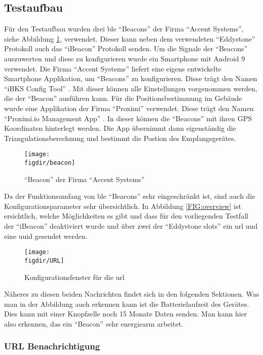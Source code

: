 \subsection{Testaufbau}
\label{ss:ibeacon:kommunikation}

Für den Testaufbau wurden drei \ac{ble} "`Beacons"' der Firma "`Accent Systems"', siehe Abbildung \ref{FIG:beacon}, verwendet. Dieser kann neben dem verwendeten "`Eddystone"' Protokoll auch das "`iBeacon"' Protokoll senden. Um die Signale der "`Beacons"' auszuwerten und diese zu konfigurieren wurde ein Smartphone mit Android 9 verwendet. Die Firma "`Accent Systems"' liefert eine eigens entwickelte Smartphone Applikation, um "`Beacons"' zu konfigurieren. Diese trägt den Namen "`iBKS Config Tool"' \cite{BKS:WWW}. Mit dieser können alle Einstellungen vorgenommen werden, die der "`Beacon"' ausführen kann. Für die Positionsbestimmung im Gebäude wurde eine Applikation der Firma "`Proximi"' verwendet. Diese trägt den Namen "`Proximi.io Management App"' \cite{PRX:WWW}. In dieser können die "`Beacons"' mit ihren GPS Koordinaten hinterlegt werden. Die App übernimmt dann eigenständig die Triangulationsberechnung und bestimmt die Postion des Empfangsgerätes.\\ 

\begin{figure}[h]
	\centering
	\texttt{[image: \\figdir/beacon]}
	\caption{"`Beacon"' der Firma "`Accent Systems"'}
	\label{FIG:beacon}
\end{figure}

\noindent Da der Funktionsumfang von \ac{ble} "`Beacons"' sehr eingeschränkt ist, sind auch die Konfigurationsparameter sehr übersichtlich. In Abbildung \ref{FIG:overview} ist ersichtlich, welche Möglichkeiten es gibt und dass für den vorliegenden Testfall der "`iBeacon"' deaktiviert wurde und über zwei der "`Eddystone slots"' ein \ac{url} und eine \ac{uuid} gesendet werden.
\begin{figure}[hbtp]
	\centering
	\texttt{[image: \\figdir/URL]}
	\caption{Konfigurationsfenster für die \ac{url}}
	\label{FIG:url}
\end{figure}
Näheres zu diesen beiden Nachrichten findet sich in den folgenden Sektionen. Was man in der Abbildung auch erkennen kann ist die Batterielaufzeit des Gerätes. Dies kann mit einer Knopfzelle noch 15 Monate Daten senden. Man kann hier also erkennen, das ein "`Beacon"' sehr energiearm arbeitet.\\

\subsubsection{URL Benachrichtigung}
\label{sss:ibeacon:url}


